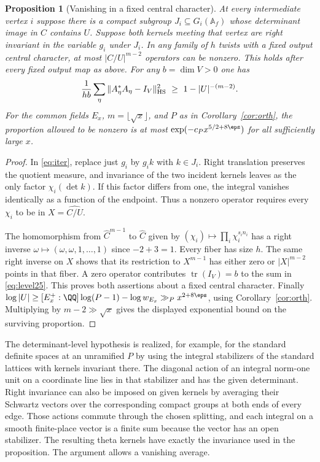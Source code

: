 \documentclass[a4paper,11pt]{article}
\newtheorem{proposition}{Proposition}[section]
\theoremstyle{definition}
\theoremstyle{remark}
\numberwithin{equation}{section}
\begin{document}
\begin{proposition}[Vanishing in a fixed central character]\label{prop:level25}
At every intermediate vertex \(i\) suppose there is a compact subgroup \(J_i\subseteq G_i(\mathbb A_f)\) whose determinant image in \(C\) contains \(U\). Suppose both kernels meeting that vertex are right invariant in the variable \(g_i\) under \(J_i\). In any family of \(h\) twists with a fixed output central character, at most \(|C/U|^{m-2}\) operators can be nonzero. This holds after every fixed output map as above. For any \(b=\dim V>0\) one has
\begin{equation}
  \frac{1}{hb}\sum_\eta\|A_\eta^*A_\eta-I_V\|_{\rm HS}^2
        \ \ge\ 1-|U|^{-(m-2)} .                       \label{eq:level25}
\end{equation}
For the common fields \(E_x\), \(m=\lfloor\sqrt x\rfloor\), and \(P\) as in Corollary~\ref{cor:orth}, the proportion allowed to be nonzero is at most \(\exp(-c_P x^{5/2+8\eps})\) for all sufficiently large \(x\).
\end{proposition}
\begin{proof}
In \eqref{eq:iter}, replace just \(g_i\) by \(g_i k\) with \(k\in J_i\). Right translation preserves the quotient measure, and invariance of the two incident kernels leaves as the only factor \(\chi_i(\det k)\). If this factor differs from one, the integral vanishes identically as a function of the endpoint. Thus a nonzero operator requires every \(\chi_i\) to be in \(X=\widehat{C/U}\).

The homomorphism from \(\widehat C^{m-1}\) to \(\widehat C\) given by \( (\chi_i)\mapsto\prod_i\chi_i^{s_i n_i}\) has a right inverse \(\omega\mapsto(\omega,\omega,1,\ldots,1)\) since \(-2+3=1\). Every fiber has size \(h\). The same right inverse on \(X\) shows that its restriction to \(X^{m-1}\) has either zero or \(|X|^{m-2}\) points in that fiber. A zero operator contributes \(\operatorname{tr}(I_V)=b\) to the sum in \eqref{eq:level25}. This proves both assertions about a fixed central character. Finally \(\log |U|\ge [E_x^+:\QQ]\log(P-1)-\log w_{E_x}\gg_P x^{2+8\eps}\), using Corollary~\ref{cor:orth}. Multiplying by \(m-2\gg\sqrt x\) gives the displayed exponential bound on the surviving proportion.
\end{proof}

The determinant-level hypothesis is realized, for example, for the standard definite spaces at an unramified \(P\) by using the integral stabilizers of the standard lattices with kernels invariant there. The diagonal action of an integral norm-one unit on a coordinate line lies in that stabilizer and has the given determinant. Right invariance can also be imposed on given kernels by averaging their Schwartz vectors over the corresponding compact groups at both ends of every edge. Those actions commute through the chosen splitting, and each integral on a smooth finite-place vector is a finite sum because the vector has an open stabilizer. The resulting theta kernels have exactly the invariance used in the proposition. The argument allows a vanishing average.
\end{document}
